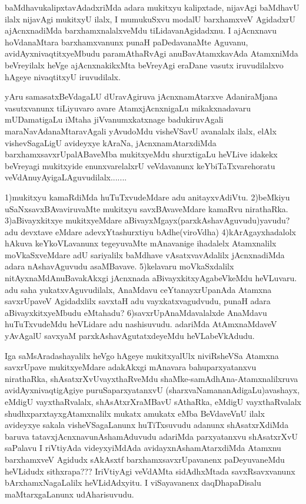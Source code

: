 \begin{artha}
baMdhavukalipxtavAdadxriMda adara mukitxyu kalipxtade, nijavAgi baMdhavU ilalx nijavAgi mukitxyU ilalx, I mumukuSxvu modalU barxhamxveV AgidadxrU ajAcnxnadiMda barxhamxnalalxveMdu tiLidavanAgidadxnu. I ajAcnxnavu hoVdanaMtara barxhamxvanunx punaH paDedavanaMte Aguvanu, avidAyxnivaqtitxyeMbudu paramAthaRvAgi anuBavAtamxkavAda AtamxniMda beVreyilalx heVge ajAcnxnakikxMta beVreyAgi eraDane vasutx iruvudilalxvo hAgeye nivaqtitxyU iruvudilalx.
\end{artha}

\begin{artha}
yAru samasatxBeVdagaLU dUravAgiruva jAcnxnamAtarxve AdaniraMjana vasutxvanunx tiLiyuvaro avare AtamxjAcnxnigaLu mikakxnadavaru mUDamatigaLu iMtaha jiVvanumxkatxnage badukiruvAgali maraNavAdanaMtaravAgali yAvudoMdu visheVSavU avanalalx ilalx, elAlx vishevSagaLigU avideyxye kAraNa, jAcnxnamAtarxdiMda barxhamxsavxrUpalABaveMba mukitxyeMdu shurxtigaLu heVLive idakekx beVreyagi mukitxyide enunxvarelalxrU veVdavanunx keYbiTaTxvarehoratu veVdAnuyAyigaLAguvudilalx.......
\end{artha}

\begin{artha}
1)mukitxyu kamaRdiMda huTuTxvudeMdare adu anitayxvAdiVtu.
2)beMkiyu uSaNxsavxBAvaviruvaMte mukitxyu savxBAvaveMdare kamaRvu nirathaRka.
3)aBivayxkitxye mukitxyeMdare aBivayxMgayx(parxkAshavAguvudu)yavudu? adu devxtave eMdare adevxYtashurxtiyu bAdhe(viroVdha)
4)kArAgayxhadalolx hAkuva keYkoVLavanunx tegeyuvaMte mAnavanige ihadalelx Atamxnalilx moVkaSxveMdare adU sariyalilx baMdhave vAsatxvavAdalilx jAcnxnadiMda adara nAshavAguvudu asaMBavave.
5)kelavaru moVkaSxdalilx nitAyxnaMdAnuBavakAkxgi jAcnxnada aBivayxkitxyAgabeVkeMdu heVLuvaru. adu saha yukatxvAguvudilalx, AnaMdavu ceYtanayxrUpanAda Atamxna savxrUpaveV Agidadxlilx savxtaH adu vayxkatxvagudvudu, punaH adara aBivayxkitxyeMbudu eMtahadu?
6)savxrUpAnaMdavalalxde AnaMdavu huTuTxvudeMdu heVLidare adu nashisuvudu. adariMda AtAmxnaMdaveV yAvAgalU savxyaM parxkAshavAgutatxdeyeMdu heVLabeVkAdudu.
\end{artha}

\begin{artha}
Iga saMsAradashayalilx heVgo hAgeye mukitxyalUlx niviRsheVSa Atamxna savxrUpave mukitxyeMdare adakAkxgi mAnavara bahuparxyatanxvu nirathaRka, shAsatxrXvUvayxthaRveMdu shaMke-samAdhAna-Atamxnalilxruva avidAyxnivaqtigAgiye puruSaparxyatanxvU (sharxvaNamananAdigaLu)avashayx, eMdigU vayxthaRvalalx, shAsAtxrXraMBavU sAthaRka, eMdigU vayxthaRvalalx shudhxparxtayxgAtamxnalilx mukatx amukatx eMba BeVdaveVnU ilalx avideyxye sakala visheVSagaLanunx huTiTxsuvudu adanunx shAsatxrXdiMda baruva tatavxjAcnxnavunAshamAduvudu adariMda parxyatanxvu shAsatxrXvU saPalavu I riVtiyAda videyxyiMdAda avidayxnAshamAtarxdiMda Atamxnu barxhamxveV Agidudx sAkAsxtf barxhamxsavxrUpavanenx paDeyuvaneMdu heVLidudx sithxrapa??? IriVtiyAgi veVdAMta sidAdhxMtada savxRsavxvanunx bArxhamxNagaLalilx heVLidAdxyitu. I viSayavanenx daqDhapaDisalu maMtarxgaLanunx udAharisuvudu.
\end{artha}

